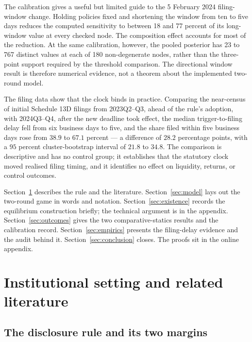 \documentclass[11pt]{article}
\begin{document}
The calibration gives a useful but limited guide to the 5 February 2024 filing-window
change. Holding policies fixed and shortening
the window from ten to five days reduces the computed sensitivity to between 18 and 77 percent of its
long-window value at every checked node. The composition effect accounts for most of the reduction.
At the same calibration, however, the pooled posterior has 23 to 767 distinct values at each of 180
non-degenerate nodes, rather than the three-point support required by the threshold comparison. The
directional window result is therefore numerical evidence, not a theorem about the implemented
two-round model.

The filing data show that the clock binds in practice. Comparing the near-census of initial
Schedule 13D filings from 2023Q2--Q3, ahead of the rule's adoption, with 2024Q3--Q4, after the
new deadline took effect, the median trigger-to-filing delay fell from six business days to
five, and the share filed within five business days rose from $38.9$ to $67.1$ percent --- a
difference of $28.2$ percentage points, with a $95$ percent cluster-bootstrap interval of
$21.8$ to $34.8$. The comparison is descriptive and has no control group; it establishes that
the statutory clock moved realised filing timing, and it identifies no effect on liquidity,
returns, or control outcomes.

Section~\ref{sec:lit} describes the rule and the literature. Section~\ref{sec:model} lays out the
two-round game in words and notation. Section~\ref{sec:existence} records the equilibrium construction
briefly; the technical argument is in the appendix. Section~\ref{sec:outcomes} gives the two
comparative-statics results and the calibration record. Section~\ref{sec:empirics} presents the
filing-delay evidence and the audit behind it. Section~\ref{sec:conclusion} closes. The proofs
sit in the online appendix.

\section{Institutional setting and related literature}
\label{sec:lit}

\subsection{The disclosure rule and its two margins}
\label{sec:institutional}
\end{document}
